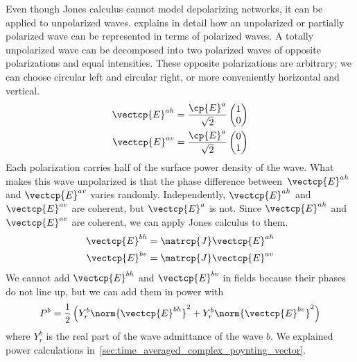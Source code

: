 \begin{refsection}
Even though Jones calculus cannot model depolarizing networks, it can be applied to unpolarized waves.
\textcite{goodman1985statistical} explains in detail how an unpolarized or partially polarized wave can be represented in terms of polarized waves.
A totally unpolarized wave can be decomposed into two polarized waves of opposite polarizations and equal intensities.
These opposite polarizations are arbitrary; we can choose circular left and circular right, or more conveniently horizontal and vertical.
\begin{equation}
    \begin{aligned}
        \vectcp{E}^{ah}
        &=
        \frac{\cp{E}^a}{\sqrt{2}}
        \begin{pmatrix}
            1 \\ 0
        \end{pmatrix}
        \\
        \vectcp{E}^{av}
        &=
        \frac{\cp{E}^a}{\sqrt{2}}
        \begin{pmatrix}
            0 \\ 1
        \end{pmatrix}
    \end{aligned}
\end{equation}
Each polarization carries half of the surface power density of the wave.
What makes this wave unpolarized is that the phase difference between~$\vectcp{E}^{ah}$ and $\vectcp{E}^{av}$ varies randomly.
Independently, $\vectcp{E}^{ah}$ and $\vectcp{E}^{av}$ are coherent, but $\vectcp{E}^a$ is not.
Since $\vectcp{E}^{ah}$ and $\vectcp{E}^{av}$ are coherent, we can apply Jones calculus to them.
\begin{equation}
    \begin{aligned}
        \vectcp{E}^{bh}
        &=
        \matrcp{J}
        \vectcp{E}^{ah}
        \\
        \vectcp{E}^{bv}
        &=
        \matrcp{J}
        \vectcp{E}^{av}
    \end{aligned}
\end{equation}
We cannot add $\vectcp{E}^{bh}$ and $\vectcp{E}^{bv}$ in fields because their phases do not line up, but we can add them in power with
\begin{equation}
    P^b
    =
    \frac{1}{2}
    \left(
        Y^b_r \norm{\vectcp{E}^{bh}}^2 + Y^b_r \norm{\vectcp{E}^{bv}}^2
    \right)
\end{equation}
where $Y^b_r$ is the real part of the wave admittance of the wave $b$.
We explained power calculations in~\cref{sec:time_averaged_complex_poynting_vector}.


\end{refsection}

